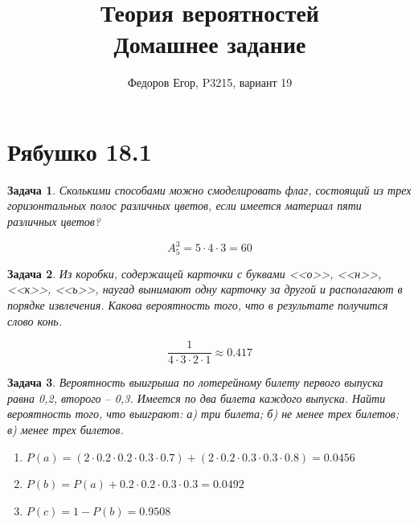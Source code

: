 \documentclass{article}
\title{\textbf{Теория вероятностей} \\ Домашнее задание \textnumero 1}
\author{Федоров Егор, P3215, вариант 19}
\date{}
\theoremstyle{problemstyle}
\newtheorem{problem}{Задача}[section]
\begin{document}
\maketitle
\section{Рябушко 18.1}
\begin{problem}
    Сколькими способами можно смоделировать флаг,
    состоящий из трех горизонтальных полос различных цветов,
    если имеется материал пяти различных цветов?

    \[ 
        A_5^3 = 5 \cdot 4 \cdot 3 = 60
    \]
\end{problem}

\begin{problem}
    Из коробки, содержащей карточки с буквами <<о>>, <<н>>, <<к>>, <<ь>>,
    наугад вынимают одну карточку за другой и располагают в порядке извлечения.
    Какова вероятность того, что в результате получится слово конь.

    \[
        \frac{1}{4 \cdot 3 \cdot 2 \cdot 1} \approx 0.417
    \]
\end{problem}

\begin{problem}
    Вероятность выигрыша по лотерейному билету первого выпуска равна 0,2, второго – 0,3.
    Имеется по два билета каждого выпуска. Найти вероятность того, что выиграют:
    а) три билета; б) не менее трех билетов; в) менее трех билетов.

    \begin{enumerate}[label=\alph*]
        \item $ P(a) = (2 \cdot 0.2 \cdot 0.2 \cdot 0.3 \cdot 0.7) + (2 \cdot 0.2 \cdot 0.3 \cdot 0.3 \cdot 0.8) = 0.0456 $

        \item $ P(b) = P(a) + 0.2 \cdot 0.2 \cdot 0.3 \cdot 0.3 = 0.0492 $ 

        \item $ P(c) = 1 - P(b) = 0.9508$ 
    \end{enumerate}
\end{problem}
\end{document}
